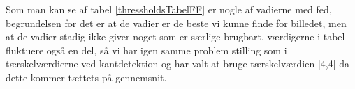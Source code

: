 Som man kan se af tabel \ref{thressholdsTabelFF} er nogle af vadierne med fed, begrundelsen for det er
at de vadier er de beste vi kunne finde for billedet, men at de vadier stadig
ikke giver noget som er særlige brugbart.
værdigerne i tabel fluktuere også en del, så vi har igen samme problem stilling
som i tærskelværdierne ved kantdetektion og har valt at bruge tærskelværdien
[4,4] da dette kommer tættets på gennemsnit.
